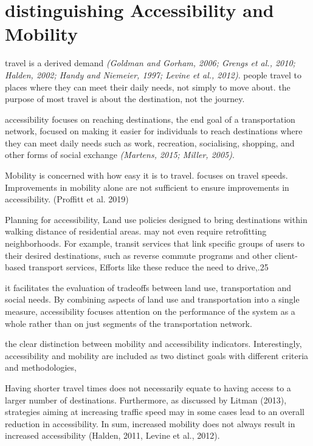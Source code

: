 \documentclass[12pt,]{article}
\begin{document}
\hypertarget{distinguishing-accessibility-and-mobility}{%
\section{distinguishing Accessibility and
Mobility}\label{distinguishing-accessibility-and-mobility}}

travel is a derived demand \emph{(Goldman and Gorham, 2006; Grengs et
al., 2010; Halden, 2002; Handy and Niemeier, 1997; Levine et al.,
2012)}. people travel to places where they can meet their daily needs,
not simply to move about. the purpose of most travel is about the
destination, not the journey.

accessibility focuses on reaching destinations, the end goal of a
transportation network, focused on making it easier for individuals to
reach destinations where they can meet daily needs such as work,
recreation, socialising, shopping, and other forms of social exchange
\emph{(Martens, 2015; Miller, 2005)}.

Mobility is concerned with how easy it is to travel. focuses on travel
speeds. Improvements in mobility alone are not sufficient to ensure
improvements in accessibility. (Proffitt et al. 2019)

Planning for accessibility, Land use policies designed to bring
destinations within walking distance of residential areas. may not even
require retrofitting neighborhoods. For example, transit services that
link specific groups of users to their desired destinations, such as
reverse commute programs and other client-based transport services,
Efforts like these reduce the need to drive,.25

it facilitates the evaluation of tradeoffs between land use,
transportation and social needs. By combining aspects of land use and
transportation into a single measure, accessibility focuses attention on
the performance of the system as a whole rather than on just segments of
the transportation network.

the clear distinction between mobility and accessibility indicators.
Interestingly, accessibility and mobility are included as two distinct
goals with different criteria and methodologies,

Having shorter travel times does not necessarily equate to having access
to a larger number of destinations. Furthermore, as discussed by Litman
(2013), strategies aiming at increasing traffic speed may in some cases
lead to an overall reduction in accessibility. In sum, increased
mobility does not always result in increased accessibility (Halden,
2011, Levine et al., 2012).
\end{document}
